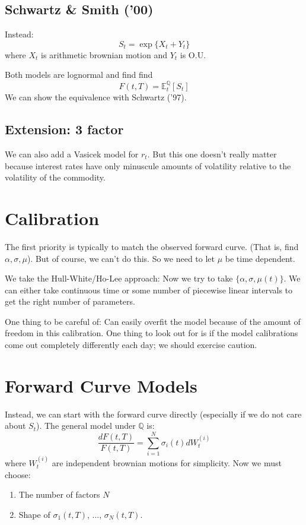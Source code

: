 \documentclass[twocolumn,openany]{book}
\begin{document}
\subsection{Schwartz \& Smith ('00)}
Instead:
\begin{equation}
	S_t = \exp \{ X_t + Y_t \}
\end{equation}
where $X_t$ is arithmetic brownian motion and $Y_t$ is O.U.

Both models are lognormal and find find
\begin{equation}
	F(t,T) = \mathbb{E}_t^\mathbb{Q}[S_t]
\end{equation}
We can show the equivalence with Schwartz ('97).

\subsection{Extension: 3 factor}
We can also add a Vasicek model for $r_t$. But this one doesn't really matter because interest rates have only minuscule amounts of volatility relative to the volatility of the commodity.

\section{Calibration}
The first priority is typically to match the observed forward curve. (That is, find $\alpha, \sigma, \mu$). But of course, we can't do this. So we need to let $\mu$ be time dependent.

We take the Hull-White/Ho-Lee approach: Now we try to take $\{\alpha, \sigma, \mu(t)\}$. We can either take continuous time or some number of piecewise linear intervals to get the right number of parameters.

One thing to be careful of: Can easily overfit the model because of the amount of freedom in this calibration. One thing to look out for is if the model calibrations come out completely differently each day; we should exercise caution.

\section{Forward Curve Models}
Instead, we can start with the forward curve directly (especially if we do not care about $S_t$). The general model under $\mathbb{Q}$ is:
\begin{equation}
	\frac{dF(t,T)}{F(t,T)} = \sum_{i=1}^N \sigma_i(t) dW_t^{(i)}
\end{equation}
where $W_t^{(i)}$ are independent brownian motions for simplicity.  
Now we must choose:
\begin{enumerate}
	\item The number of factors $N$
	\item Shape of $\sigma_1(t,T)$, ..., $\sigma_N(t,T)$.
\end{enumerate}
\end{document}
